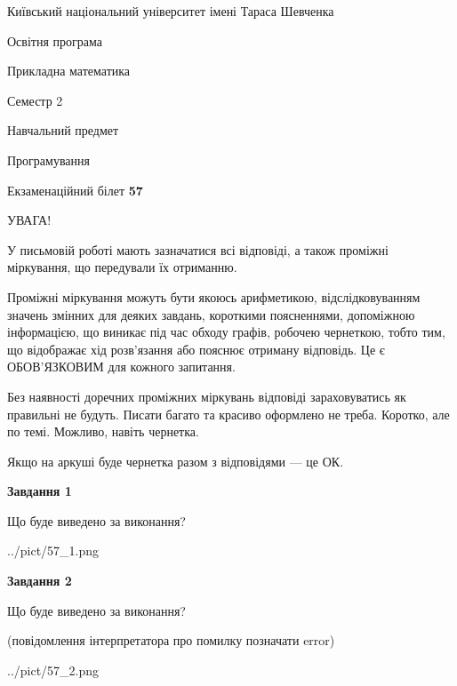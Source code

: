 \documentclass[12pt, ukrainian]{article}
\begin{document}
{{\begin {small}\par
{ \center  Київський національний університет імені Тараса Шевченка \par}
{\parbox {5 cm}{Освітня програма \hfill}{\parbox {7 cm}{Прикладна математика\hfill}}\parbox {6 cm}{\hfill Семестр 2}}\par
{\parbox {5 cm} {Навчальний предмет \hfill}\parbox {7 cm}{Програмування \hfill}\parbox {6cm}{\hfill}\par}\vspace{-7pt} \end{small}}{\center Екзаменаційний білет \No \textbf
{ 57 }\par}}
{
\begin {large}
УВАГА!

У письмовій роботі мають зазначатися всі відповіді, а також проміжні міркування, що передували їх отриманню.

Проміжні міркування можуть бути якоюсь арифметикою, відслідковуванням зна\-чень змінних для деяких завдань,
короткими поясненнями, допоміжною інформацією, що виникає під час обходу графів, робочею чернеткою,
тобто тим, що відображає хід розв’язання або пояснює отриману відповідь.
Це є ОБОВ’ЯЗКОВИМ для кожного запитання.

Без наявності доречних проміжних міркувань відповіді зараховуватись як правиль\-ні не будуть.
Писати багато та красиво оформлено не треба. Коротко, але по темі. Можли\-во, навіть чернетка.

Якщо на аркуші буде чернетка разом з відповідями --- це ОК.

\newpage

{\begin {center}\textbf{Завдання 1}\end {center}}\par
Що буде виведено за виконання?\par
\begin{center}
	{../pict/57_1.png}
\end{center}
\newpage

{\begin {center}\textbf{Завдання 2}\end {center}}\par
Що буде виведено за виконання?\par
 (повідомлення інтерпретатора про помилку позначати error)\par
\begin{center}
	{../pict/57_2.png}
\end{center}
\newpage


\end{large}}
\end{document}
